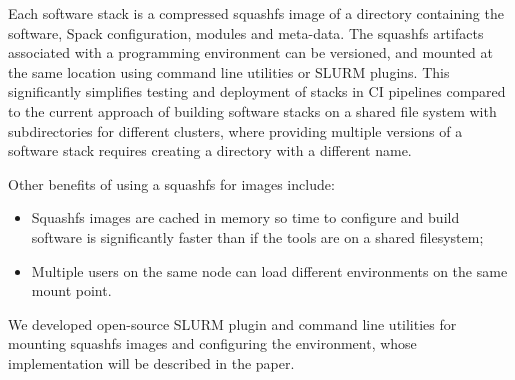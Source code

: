 Each software stack is a compressed squashfs image of a directory containing the software, Spack configuration, modules and meta-data.
The squashfs artifacts associated with a programming environment can be versioned, and mounted at the same location using command line utilities or SLURM plugins.
This significantly simplifies testing and deployment of stacks in CI pipelines compared to the current approach of building software stacks on a shared file system with subdirectories for different clusters, where providing multiple versions of a software stack requires creating a directory with a different name.

Other benefits of using a squashfs for images include:
\begin{itemize}
    \item Squashfs images are cached in memory so time to configure and build software is significantly faster than if the tools are on a shared filesystem;
    \item Multiple users on the same node can load different environments on the same mount point.
\end{itemize}

We developed open-source SLURM plugin and command line utilities for mounting squashfs images and configuring the environment, whose implementation will be described in the paper.


